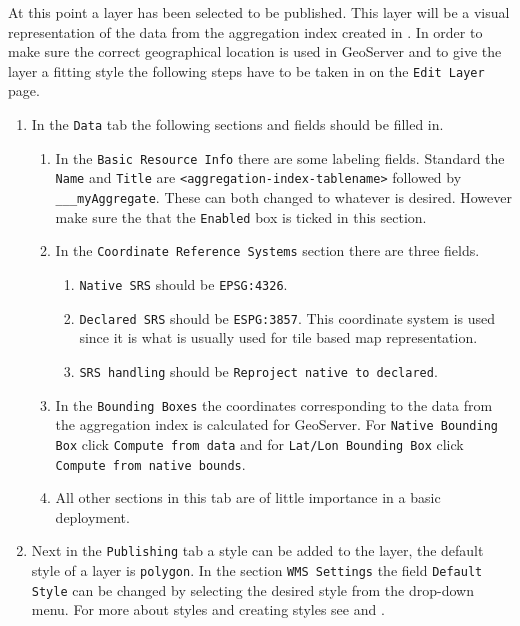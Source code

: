 \noindent At this point a layer has been selected to be published. This layer will be a visual representation of the data from the aggregation index created in . In order to make sure the correct geographical location is used in GeoServer and to give the layer a fitting style the following steps have to be taken in on the \lstinline|Edit Layer| page.


\begin{enumerate}[resume]
	\item In the \lstinline|Data| tab the following sections and fields should be filled in.
	\begin{enumerate}
		\item In the \lstinline|Basic Resource Info| there are some labeling fields. Standard the \lstinline|Name| and \lstinline|Title| are \lstinline|<aggregation-index-tablename>| followed by \lstinline|___myAggregate|. These can both changed to whatever is desired. However make sure the that the \lstinline|Enabled| box is ticked in this section.
		\item In the \lstinline|Coordinate Reference Systems| section there are three fields.
			\begin{enumerate}
				\item \lstinline|Native SRS| should be \lstinline|EPSG:4326|.
				\item \lstinline|Declared SRS| should be \lstinline|ESPG:3857|. This coordinate system is used since it is what is usually used for tile based map representation.
				\item \lstinline|SRS handling| should be \lstinline|Reproject native to declared|.
			\end{enumerate}
		\item In the \lstinline|Bounding Boxes| the coordinates corresponding to the data from the aggregation index is calculated for GeoServer. For \lstinline|Native Bounding Box| click \lstinline|Compute from data| and for \lstinline|Lat/Lon Bounding Box| click \lstinline|Compute from native bounds|.
		\item All other sections in this tab are of little importance in a basic deployment.
	\end{enumerate}
	\item Next in the \lstinline|Publishing| tab a style can be added to the layer, the default style of a layer is \lstinline|polygon|. In the section \lstinline|WMS Settings| the field \lstinline|Default| \lstinline|Style| can be changed by selecting the desired style from the drop-down menu. For more about styles and creating styles see  and .
\end{enumerate}

